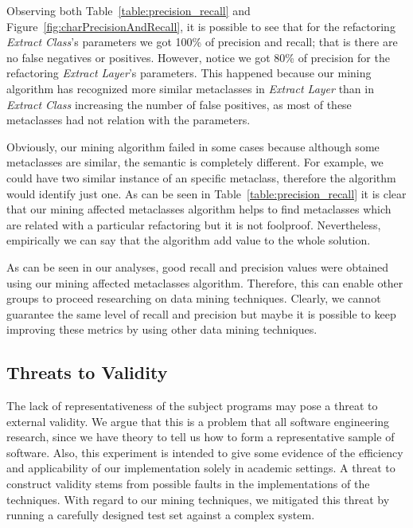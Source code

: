 Observing  both Table~\ref{table:precision_recall} and Figure~\ref{fig:charPrecisionAndRecall}, it is possible to see that for the refactoring \textit{Extract Class}'s parameters we got 100\% of precision and recall; that is there are no false negatives or positives. However, notice we got 80\% of precision for the refactoring \textit{Extract Layer}'s parameters. This happened because our mining algorithm has recognized more similar metaclasses in \textit{Extract Layer} than in \textit{Extract Class} increasing the number of false positives, as most of these metaclasses had not relation with the parameters.

Obviously, our mining algorithm failed in some cases because although some metaclasses are similar, the semantic is completely different. For example, we could have two similar instance of an specific metaclass, therefore the algorithm would identify just one. %
As can be seen in Table~\ref{table:precision_recall} it is clear that our mining affected metaclasses algorithm helps to find metaclasses which are related with a particular refactoring but it is not foolproof. Nevertheless, empirically we can say that the algorithm add value to the whole solution.

As can be seen in our analyses, good recall and precision values were obtained using our mining affected metaclasses algorithm. Therefore, this can enable other groups to proceed researching on data mining techniques. Clearly, we cannot guarantee the same level of recall and precision but maybe it is possible to keep improving these metrics by using other data mining techniques.

\subsection{Threats to Validity}

The lack of representativeness of the subject programs may pose a threat to external validity. We argue that this is a problem that all software engineering research, since we have theory to tell us how to form a representative sample of software. %
Also, this experiment is intended to give some evidence of the efficiency and applicability of our implementation solely in academic settings. A threat to construct validity stems from possible faults in the implementations of the techniques. With regard to our mining techniques, we mitigated this threat by running a carefully designed test set against a complex system.